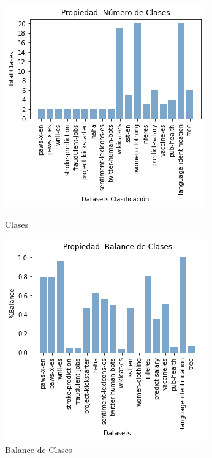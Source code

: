 \begin{figure}[!h]
    \begin{minipage}[b]{0.5\textwidth}
        \centering
        \includegraphics[width=\textwidth]{Graphics/results/class.png}
          \caption{Clases}
          \label{fig:clases}
    \end{minipage}      
    \hspace{0.02cm}
    \begin{minipage}[b]{0.5\textwidth}
        \centering
        \includegraphics[width=\textwidth]{Graphics/results/balance.png}
          \caption{Balance de Clases}
          \label{fig:balance}
        \end{minipage} 
\end{figure}


